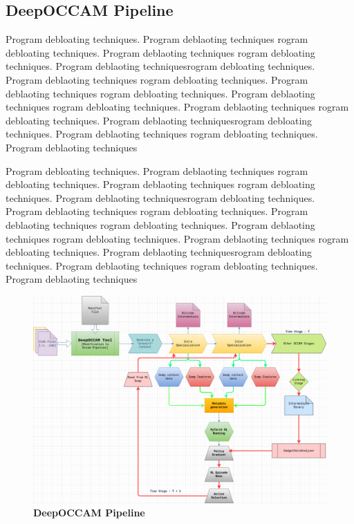 \documentclass{relatorio}
\begin{document}
\subsection{DeepOCCAM Pipeline}%
\label{Tools}

Program debloating techniques. Program deblaoting techniques rogram debloating techniques. Program deblaoting techniques
rogram debloating techniques. Program deblaoting techniquesrogram debloating techniques. Program deblaoting techniques
rogram debloating techniques. Program deblaoting techniques rogram debloating techniques. Program deblaoting techniques
rogram debloating techniques. Program deblaoting techniques 
rogram debloating techniques. Program deblaoting techniquesrogram debloating techniques. Program deblaoting techniques
rogram debloating techniques. Program deblaoting techniques

Program debloating techniques. Program deblaoting techniques rogram debloating techniques. Program deblaoting techniques
rogram debloating techniques. Program deblaoting techniquesrogram debloating techniques. Program deblaoting techniques
rogram debloating techniques. Program deblaoting techniques rogram debloating techniques. Program deblaoting techniques
rogram debloating techniques. Program deblaoting techniques 
rogram debloating techniques. Program deblaoting techniquesrogram debloating techniques. Program deblaoting techniques
rogram debloating techniques. Program deblaoting techniques

\onecolumn
\begin{figure}[H]
	\centering
	\captionsetup{justification=centering}
	\includegraphics[width=1\linewidth]{imgs/deepoccam-pipeline.png}
	\caption{\textbf{DeepOCCAM Pipeline}}%
	\label{fig:plant}
\end{figure}
\twocolumn
\end{document}
